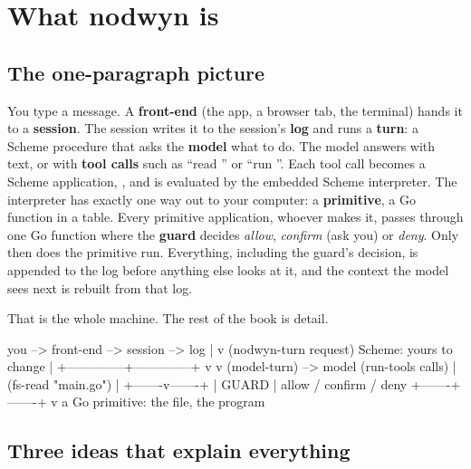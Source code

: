 \chapter{What nodwyn is}
\label{ch:what}

\section{The one-paragraph picture}

You type a message. A \textbf{front-end} (the app, a browser tab, the
terminal) hands it to a \textbf{session}. The session writes it to the
session's \textbf{log} and runs a \textbf{turn}: a Scheme procedure that asks
the \textbf{model} what to do. The model answers with text, or with
\textbf{tool calls} such as ``read '' or ``run ''.
Each tool call becomes a Scheme application, , and
is evaluated by the embedded Scheme interpreter. The interpreter has exactly
one way out to your computer: a \textbf{primitive}, a Go function in a table.
Every primitive application, whoever makes it, passes through one Go
function where the \textbf{guard} decides \emph{allow}, \emph{confirm} (ask
you) or \emph{deny}. Only then does the primitive run. Everything, including
the guard's decision, is appended to the log before anything else looks at
it, and the context the model sees next is rebuilt from that log.

That is the whole machine. The rest of the book is detail.

\begin{txt}
   you --> front-end --> session --> log
                            |
                            v
                  (nodwyn-turn request)            Scheme: yours to change
                            |
             +--------------+--------------+
             v                             v
       (model-turn) --> model        (run-tools calls)
                                           |
                                  (fs-read "main.go")
                                           |
                                   +-------v-------+
                                   |     GUARD     |   allow / confirm / deny
                                   +-------+-------+
                                           v
                              a Go primitive: the file, the program
\end{txt}

\section{Three ideas that explain everything}

